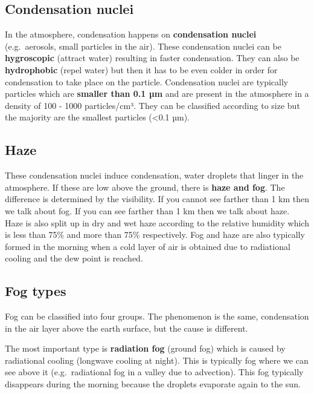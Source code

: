 \documentclass[oneside]{book}
\begin{document}
\subsection{Condensation nuclei}\label{condensation-nuclei}

In the atmosphere, condensation happens on \textbf{condensation nuclei}
(e.g.~aerosols, small particles in the air). These condensation nuclei
can be \textbf{hygroscopic} (attract water) resulting in faster
condensation. They can also be \textbf{hydrophobic} (repel water) but
then it has to be even colder in order for condensation to take place on
the particle. Condensation nuclei are typically particles which are
\textbf{smaller than 0.1 µm} and are present in the atmosphere in a
density of 100 - 1000 particles/cm³. They can be classified according to
size but the majority are the smallest particles (\textless{}0.1 µm).

\subsection{Haze}\label{haze}

These condensation nuclei induce condensation, water droplets that
linger in the atmosphere. If these are low above the ground, there is
\textbf{haze and fog}. The difference is determined by the visibility.
If you cannot see farther than 1 km then we talk about fog. If you can
see farther than 1 km then we talk about haze. Haze is also split up in
dry and wet haze according to the relative humidity which is less than
75\% and more than 75\% respectively. Fog and haze are also typically
formed in the morning when a cold layer of air is obtained due to
radiational cooling and the dew point is reached.

\subsection{Fog types}\label{fog-types}

Fog can be classified into four groups. The phenomenon is the same,
condensation in the air layer above the earth surface, but the cause is
different.

The most important type is \textbf{radiation fog} (ground fog) which is
caused by radiational cooling (longwave cooling at night). This is
typically fog where we can see above it (e.g.~radiational fog in a
valley due to advection). This fog typically disappears during the
morning because the droplets evaporate again to the sun.
\end{document}
